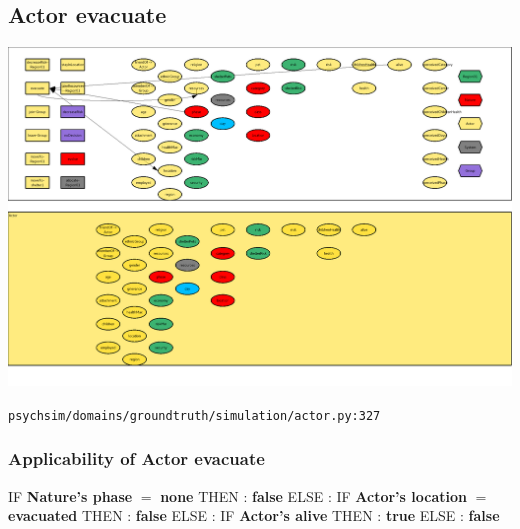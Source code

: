 \documentclass{article}%
\begin{document}
\subsection{Actor evacuate}%
\label{subsec:Actor evacuate}%
\includegraphics[width=\textwidth]{images/Actor-evacuate.png}%
\begin{flushleft}%
\verb|psychsim/domains/groundtruth/simulation/actor.py:327|%
\end{flushleft}%
\subsubsection{Applicability of Actor evacuate}%
\label{ssubsec:Applicability of Actor evacuate}%
\begin{flushleft}%
IF %
\textbf{Nature's phase}%
$=$%
\textbf{none}%
\linebreak%
\hspace*{2em}%
THEN %
: %
\textbf{false}%
\linebreak%
\hspace*{2em}%
ELSE %
: %
IF %
\textbf{Actor's location}%
$=$%
\textbf{evacuated}%
\linebreak%
\hspace*{4em}%
THEN %
: %
\textbf{false}%
\linebreak%
\hspace*{4em}%
ELSE %
: %
IF %
\textbf{Actor's alive}%
\linebreak%
\hspace*{6em}%
THEN %
: %
\textbf{true}%
\linebreak%
\hspace*{6em}%
ELSE %
: %
\textbf{false}%
\end{flushleft}
\end{document}
